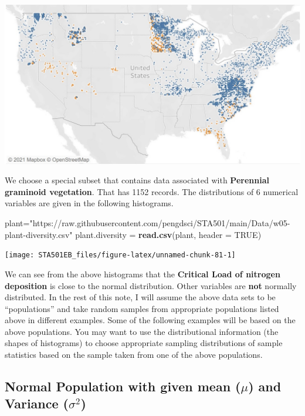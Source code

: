 \documentclass[
]{book}
\newenvironment{Shaded}{\begin{snugshade}}{\end{snugshade}}
\newcommand{\AttributeTok}[1]{\textcolor[rgb]{0.13,0.29,0.53}{#1}}
\newcommand{\ConstantTok}[1]{\textcolor[rgb]{0.56,0.35,0.01}{#1}}
\newcommand{\FunctionTok}[1]{\textcolor[rgb]{0.13,0.29,0.53}{\textbf{#1}}}
\newcommand{\NormalTok}[1]{#1}
\newcommand{\OtherTok}[1]{\textcolor[rgb]{0.56,0.35,0.01}{#1}}
\newcommand{\StringTok}[1]{\textcolor[rgb]{0.31,0.60,0.02}{#1}}
\begin{document}
\begin{center}\includegraphics[width=0.8\linewidth]{img05/w05-site-map} \end{center}

We choose a special subset that contains data associated with \textbf{Perennial graminoid vegetation}. That has 1152 records. The distributions of 6 numerical variables are given in the following histograms.

\begin{Shaded}
\begin{Highlighting}[]
\NormalTok{plant}\OtherTok{=}\StringTok{"https://raw.githubusercontent.com/pengdsci/STA501/main/Data/w05{-}plant{-}diversity.csv"}
\NormalTok{plant.diversity }\OtherTok{=} \FunctionTok{read.csv}\NormalTok{(plant, }\AttributeTok{header =} \ConstantTok{TRUE}\NormalTok{)}
\end{Highlighting}
\end{Shaded}

\begin{center}\texttt{[image: STA501EB\_files/figure-latex/unnamed-chunk-81-1]} \end{center}

We can see from the above histograms that the \textbf{Critical Load of nitrogen deposition} is close to the normal distribution. Other variables are \textbf{not} normally distributed. In the rest of this note, I will assume the above data sets to be ``populations'' and take random samples from appropriate populations listed above in different examples. Some of the following examples will be based on the above populations. You may want to use the distributional information (the shapes of histograms) to choose appropriate sampling distributions of sample statistics based on the sample taken from one of the above populations.

\hypertarget{normal-population-with-given-mean-mu-and-variance-sigma2}{%
\subsection{\texorpdfstring{Normal Population with given mean (\(\mu\)) and Variance (\(\sigma^2\))}{Normal Population with given mean (\textbackslash mu) and Variance (\textbackslash sigma\^{}2)}}\label{normal-population-with-given-mean-mu-and-variance-sigma2}}
\end{document}
